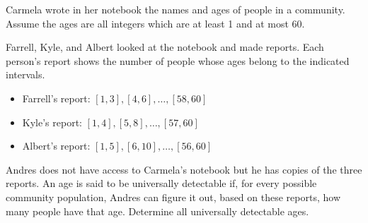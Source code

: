 Carmela wrote in her notebook the names and ages of people in a community. Assume the ages are all integers which are at least 1 and at most 60.



Farrell, Kyle, and Albert looked at the notebook and made reports. Each person's report shows the number of people whose ages belong to the indicated intervals.

\begin{itemize}

\item Farrell's report: $[1,3],[4,6],\dots,[58,60]$

\item Kyle's report: $[1,4],[5,8],\dots,[57,60]$

\item Albert's report: $[1,5],[6,10],\dots,[56,60]$

\end{itemize}



Andres does not have access to Carmela's notebook but he has copies of the three reports. An age is said to be universally detectable if, for every possible community population, Andres can figure it out, based on these reports, how many people have that age. Determine all universally detectable ages.
